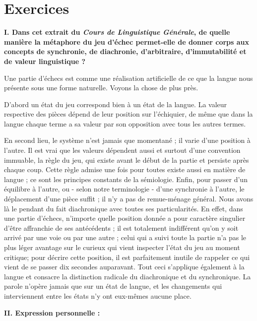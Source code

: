 \section*{Exercices}
\noindent\textbf{I. Dans cet extrait du \textit{Cours de Linguistique Générale}, de quelle manière la métaphore du jeu d’échec permet-elle de donner corps aux concepts de synchronie, de diachronie, d’arbitraire, d’immutabilité et de valeur linguistique ?}
\begin{lecture}{}
Une partie d’échecs est comme une réalisation artificielle de ce que la langue nous présente sous une forme naturelle. Voyons la chose de plus près.

D’abord un état du jeu correspond bien à un état de la langue. La valeur respective des pièces dépend de leur position sur l’échiquier, de même que dans la langue chaque terme a sa valeur par son opposition avec tous les autres termes.

En second lieu, le système n’est jamais que momentané ; il varie d’une position à l’autre. Il est vrai que les valeurs dépendent aussi et surtout d’une convention immuable, la règle du jeu, qui existe avant le début de la partie et persiste après chaque coup. Cette règle admise une fois pour toutes existe aussi en matière de langue ; ce sont les principes constants de la sémiologie. Enfin, pour passer d’un équilibre à l’autre, ou - selon notre terminologie - d’une synchronie à l’autre, le déplacement d’une pièce suffit ; il n’y a pas de remue-ménage général. Nous avons là le pendant du fait diachronique avec toutes ses particularités. En effet, dans une partie d’échecs, n’importe quelle position donnée a pour caractère singulier d’être affranchie de ses antécédents ; il est totalement indifférent qu’on y soit arrivé par une voie ou par une autre ; celui qui a suivi toute la partie n’a pas le plus léger avantage sur le curieux qui vient inspecter l’état du jeu au moment critique; pour décrire cette position, il est parfaitement inutile de rappeler ce qui vient de se passer dix secondes auparavant. Tout ceci s’applique également à la langue et consacre la distinction radicale du diachronique et du synchronique. La parole n’opère jamais que sur un état de langue, et les changements qui interviennent entre les états n’y ont eux-mêmes aucune place.
\end{lecture}

\noindent\textbf{II. Expression personnelle :}

